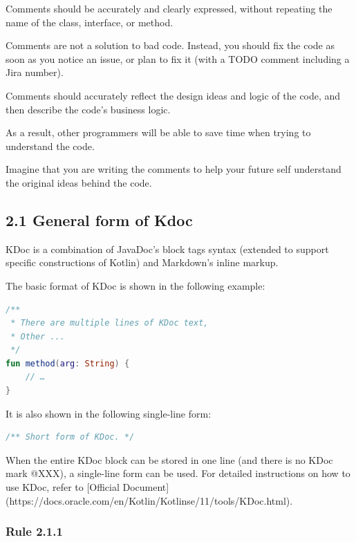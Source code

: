 Comments should be accurately and clearly expressed, without repeating the name of the class, interface, or method.

Comments are not a solution to bad code. Instead, you should fix the code as soon as you notice an issue, or plan to fix it (with a TODO comment including a Jira number).

Comments should accurately reflect the design ideas and logic of the code, and then describe the code's business logic.

As a result, other programmers will be able to save time when trying to understand the code.

Imagine that you are writing the comments to help your future self understand the original ideas behind the code. 



\subsection*{\textbf{2.1 General form of Kdoc}}

 

KDoc is a combination of JavaDoc's block tags syntax (extended to support specific constructions of Kotlin) and Markdown's inline markup.

The basic format of KDoc is shown in the following example:



\begin{lstlisting}[language=Kotlin]
 /**
 * There are multiple lines of KDoc text,
 * Other ...
 */
fun method(arg: String) {
    // …
}
\end{lstlisting}


It is also shown in the following single-line form:



\begin{lstlisting}[language=Kotlin]
 /** Short form of KDoc. */
\end{lstlisting}
When the entire KDoc block can be stored in one line (and there is no KDoc mark @XXX), a single-line form can be used. For detailed instructions on how to use KDoc, refer to [Official Document](https://docs.oracle.com/en/Kotlin/Kotlinse/11/tools/KDoc.html).



\subsubsection*{\textbf{Rule 2.1.1}}
\leavevmode\newline



